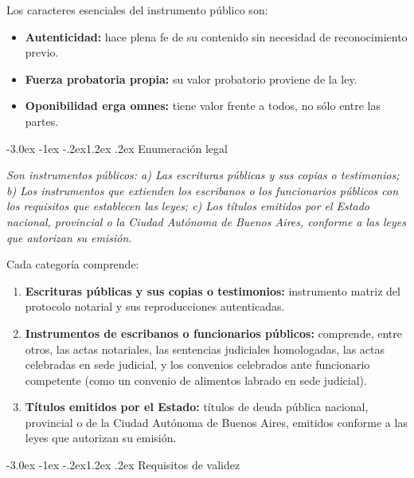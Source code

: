 \documentclass[12pt,oneside]{book}
\makeatletter
\renewcommand\section{\@startsection{section}{1}{\z@}%
  {-3.0ex \@plus -1ex \@minus -.2ex}{1.2ex \@plus .2ex}%
  {\normalfont\large\bfseries\color{acento}}}
\makeatother
\begin{document}
Los caracteres esenciales del instrumento público son:

\begin{itemize}
    \item \textbf{Autenticidad:} hace plena fe de su contenido sin necesidad de reconocimiento previo.
    \item \textbf{Fuerza probatoria propia:} su valor probatorio proviene de la ley.
    \item \textbf{Oponibilidad erga omnes:} tiene valor frente a todos, no sólo entre las partes.
\end{itemize}

\section{Enumeración legal}

\begin{regla}
\textit{Son instrumentos públicos: a) Las escrituras públicas y sus copias o testimonios; b) Los instrumentos que extienden los escribanos o los funcionarios públicos con los requisitos que establecen las leyes; c) Los títulos emitidos por el Estado nacional, provincial o la Ciudad Autónoma de Buenos Aires, conforme a las leyes que autorizan su emisión.}
\end{regla}

Cada categoría comprende:

\begin{enumerate}
    \item \textbf{Escrituras públicas y sus copias o testimonios:} instrumento matriz del protocolo notarial y sus reproducciones autenticadas.

    \item \textbf{Instrumentos de escribanos o funcionarios públicos:} comprende, entre otros, las actas notariales, las sentencias judiciales homologadas, las actas celebradas en sede judicial, y los convenios celebrados ante funcionario competente (como un convenio de alimentos labrado en sede judicial).

    \item \textbf{Títulos emitidos por el Estado:} títulos de deuda pública nacional, provincial o de la Ciudad Autónoma de Buenos Aires, emitidos conforme a las leyes que autorizan su emisión.
\end{enumerate}

\section{Requisitos de validez}
\end{document}
